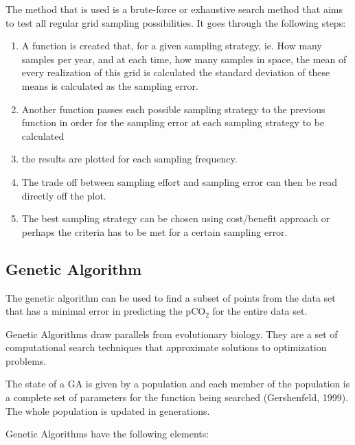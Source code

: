 \documentclass[11pt, a4paper]{article}
\numberwithin{figure}{section}
\numberwithin{table}{section}
\begin{document}
The method that is used is a brute-force or exhaustive search method that aims
to test all regular grid sampling possibilities. It goes 
through the following steps:

\begin{enumerate}
\item A function is created that, for a given sampling strategy, ie. How many 
samples per year, and at each time, how many samples in space, 
the mean of every realization of this grid is calculated
the standard deviation of these means is calculated as the sampling error.
\item Another function passes each possible sampling strategy to the previous
function in order for the sampling error at each sampling strategy to be
calculated
\item the results are plotted for each sampling frequency.
\item The trade off between sampling effort and sampling error can then be read 
directly off the plot.
\item The best sampling strategy can be chosen using cost/benefit approach or
perhaps the criteria has to be met for a certain sampling error.
\end{enumerate}

\subsection{Genetic Algorithm}
The genetic algorithm can be used to find a subset of points from the data set
that has a minimal error in predicting the pCO$_2$ for the entire data set.

Genetic Algorithms draw parallels from evolutionary biology. They are a set of
computational search techniques that approximate solutions to optimization 
problems.

The state of a GA is given by a population and each member of the population
is a complete set of parameters for the function being searched (Gershenfeld, 1999).
The whole population is updated in generations.

Genetic Algorithms have the following elements:
\end{document}
